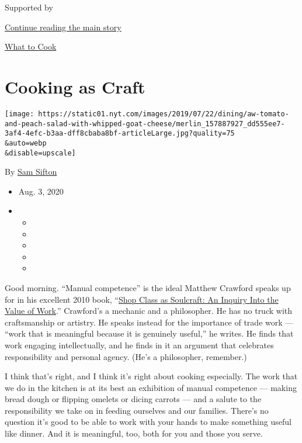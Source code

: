 Supported by

\protect\hyperlink{after-sponsor}{Continue reading the main story}

\href{/column/what-to-cook}{What to Cook}

\hypertarget{cooking-as-craft}{%
\section{Cooking as Craft}\label{cooking-as-craft}}

\texttt{[image: https://static01.nyt.com/images/2019/07/22/dining/aw-tomato-and-peach-salad-with-whipped-goat-cheese/merlin\_157887927\_dd555ee7-3af4-4efc-b3aa-dff8cbaba8bf-articleLarge.jpg?quality=75\\\&auto=webp\\\&disable=upscale]}

By \href{https://www.nytimes.com/by/sam-sifton}{Sam Sifton}

\begin{itemize}
\item
  Aug. 3, 2020
\item
  \begin{itemize}
  \item
  \item
  \item
  \item
  \item
  \end{itemize}
\end{itemize}

Good morning. ``Manual competence'' is the ideal Matthew Crawford speaks
up for in his excellent 2010 book,
``\href{https://www.penguinrandomhouse.com/books/301618/shop-class-as-soulcraft-by-matthew-b-crawford/}{Shop
Class as Soulcraft: An Inquiry Into the Value of Work}.'' Crawford's a
mechanic and a philosopher. He has no truck with craftsmanship or
artistry. He speaks instead for the importance of trade work --- ``work
that is meaningful because it is genuinely useful,'' he writes. He finds
that work engaging intellectually, and he finds in it an argument that
celebrates responsibility and personal agency. (He's a philosopher,
remember.)

I think that's right, and I think it's right about cooking especially.
The work that we do in the kitchen is at its best an exhibition of
manual competence --- making bread dough or flipping omelets or dicing
carrots --- and a salute to the responsibility we take on in feeding
ourselves and our families. There's no question it's good to be able to
work with your hands to make something useful like dinner. And it is
meaningful, too, both for you and those you serve.

